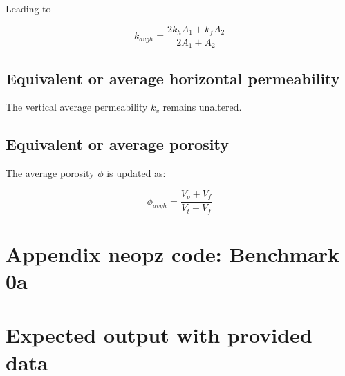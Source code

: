 \documentclass{article}
\begin{document}
Leading to 

\begin{equation}
k_{avgh}=\frac{2 k_{h}A_{1}+k_{f}A_{2}}{2 A_{1}+A_{2} }
\end{equation}

\subsection*{Equivalent or average horizontal permeability}

The vertical average permeability $k_v$ remains unaltered.

\subsection*{Equivalent or average porosity}

The average porosity $\phi$ is updated as:

\begin{equation}
\phi_{avgh}=\frac{V_{p}+V_{f}}{V_{t}+V_{f}}
\end{equation}

\section*{Appendix neopz code:  Benchmark 0a}

\section{Expected output with provided data}
\end{document}
